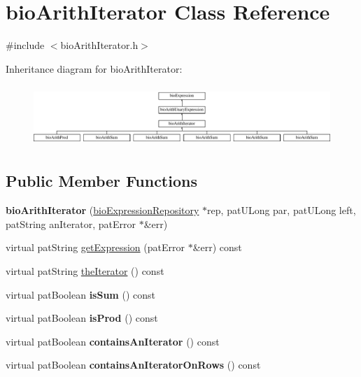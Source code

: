 \hypertarget{classbio_arith_iterator}{}\section{bio\+Arith\+Iterator Class Reference}
\label{classbio_arith_iterator}


{\ttfamily \#include $<$bio\+Arith\+Iterator.\+h$>$}

Inheritance diagram for bio\+Arith\+Iterator\+:\begin{figure}[H]
\begin{center}
\leavevmode
\includegraphics[height=2.333333cm]{classbio_arith_iterator}
\end{center}
\end{figure}
\subsection*{Public Member Functions}
\begin{DoxyCompactItemize}
\item 
\mbox{\label{classbio_arith_iterator_aa462a3be033addf63a71f4dc2587ce69}} 
{\bfseries bio\+Arith\+Iterator} (\hyperlink{classbio_expression_repository}{bio\+Expression\+Repository} $\ast$rep, pat\+U\+Long par, pat\+U\+Long left, pat\+String an\+Iterator, pat\+Error $\ast$\&err)
\item 
virtual pat\+String \hyperlink{classbio_arith_iterator_aceb6ee1a4c024349178de5edf4624710}{get\+Expression} (pat\+Error $\ast$\&err) const
\item 
virtual pat\+String \hyperlink{classbio_arith_iterator_a0e3f7a50861a44e7a62216e5a192a838}{the\+Iterator} () const
\item 
\mbox{\label{classbio_arith_iterator_ad3333ec910f68aa3c658502dc61f8c44}} 
virtual pat\+Boolean {\bfseries is\+Sum} () const
\item 
\mbox{\label{classbio_arith_iterator_a0110ce3c484d5a61d314ea5a8c51618f}} 
virtual pat\+Boolean {\bfseries is\+Prod} () const
\item 
\mbox{\label{classbio_arith_iterator_ab99e052d4167e099c6469278d8f3fe77}} 
virtual pat\+Boolean {\bfseries contains\+An\+Iterator} () const
\item 
\mbox{\label{classbio_arith_iterator_acf59ada258bca97acb1624942a06e5e0}} 
virtual pat\+Boolean {\bfseries contains\+An\+Iterator\+On\+Rows} () const
\end{DoxyCompactItemize}
